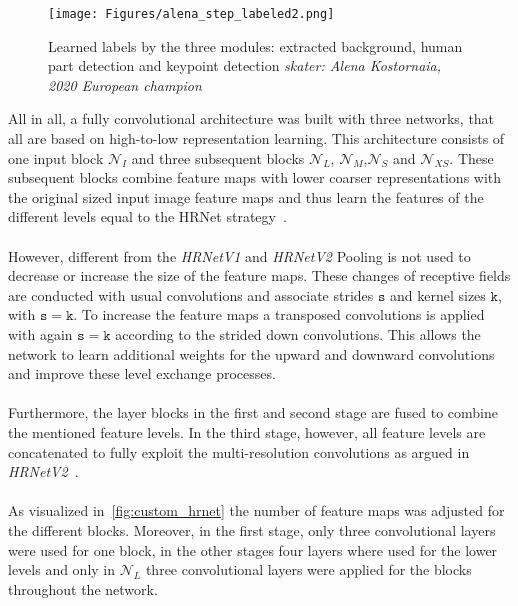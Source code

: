 \begin{figure}
    \centering
    \texttt{[image: Figures/alena\_step\_labeled2.png]}
    \decoRule
    \caption[HRNetV3: Predictions from Alena Kostornaia's Steps]{Learned labels by the three modules: extracted background, human part detection and
    keypoint detection \textit{skater: Alena Kostornaia, 2020 European champion\cite{2020european}}}
    \label{fig:alena_step_labeled}
\end{figure}


All in all, a fully convolutional architecture was built with three networks, that all are based on high-to-low
representation learning. This architecture consists of one input block $\mathcal{N}_I$  and three subsequent blocks
$\mathcal{N}_L$, $\mathcal{N}_M$,$\mathcal{N}_S$ and $\mathcal{N}_{XS}$.
These subsequent blocks combine feature maps with lower coarser representations with the original sized input image
feature maps and thus learn the features of the different levels equal to the HRNet strategy~\cite{HRNetv2, HRNetv1}.
\\\mbox{}\\
However, different from the \textit{HRNetV1} and \textit{HRNetV2} Pooling is not used to decrease or increase the size of the feature
maps. These changes of receptive fields are conducted with usual convolutions and associate strides $\mathtt{s}$ and kernel sizes
$\mathtt{k}$, with $\mathtt{s}=\mathtt{k}$.
To increase the feature maps a transposed convolutions is applied with again $\mathtt{s}=\mathtt{k}$ according to the
strided down convolutions.
This allows the network to learn additional weights for the upward and downward convolutions and improve these level
exchange processes.
\\\mbox{}\\
Furthermore, the layer blocks in the first and second stage are fused to combine the mentioned feature levels.
In the third stage, however, all feature levels are concatenated to fully exploit the multi-resolution convolutions
as argued in \textit{HRNetV2}~\cite{HRNetv2}.
\\\mbox{}\\
As visualized in~\ref{fig:custom_hrnet} the number of feature maps was adjusted for the different blocks.
Moreover, in the first stage, only three convolutional layers were used for one block, in the other stages four layers
where used for the lower levels and only in $\mathcal{N}_L$ three convolutional layers were applied for the blocks throughout the network.
\\\mbox{}\\
